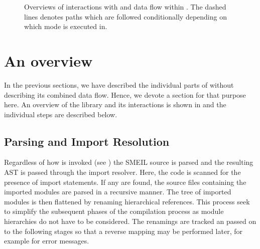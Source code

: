 \begin{figure}
{
  }
  \caption{Overviews of interactions with and data flow within \libsme{}. The
    dashed lines denotes paths which are followed conditionally depending on
    which mode \libsme{} is executed in.}
  \label{fig:overview}
\end{figure}

\section{An overview}
\label{sec:overview}
In the previous sections, we have described the individual parts of \libsme{}
without describing its combined data flow. Hence, we devote a section for that
purpose here. An overview of the \libsme{} library and its interactions is shown
in  and the individual steps are described below.

\subsection{Parsing and Import Resolution} Regardless of how \libsme{} is
invoked (see ) the SMEIL source is parsed and the resulting AST
is passed through the import resolver. Here, the code is scanned for the
presence of import statements. If any are found, the source files containing the
imported modules are parsed in a recursive manner. The tree of imported modules
is then flattened by renaming hierarchical references. This process seek to
simplify the subsequent phases of the compilation process as module hierarchies
do not have to be considered. The renamings are tracked an passed on to the
following stages so that a reverse mapping may be performed later, for example
for error messages.

